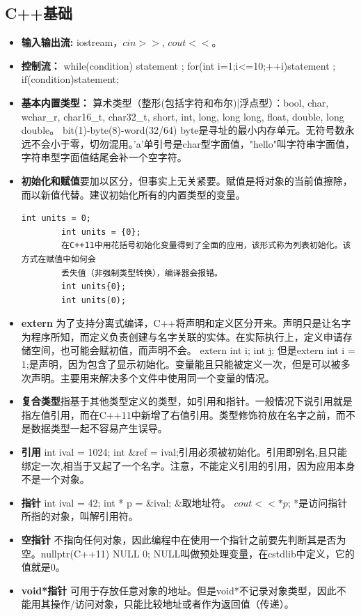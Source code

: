 \subsection{C++基础}
\begin{itemize}
	\item \textbf{输入输出流:} iostream，$cin >>$, $cout <<$。
	\item \textbf{控制流：} while(condition) {statement} ; for(int i=1;i<=10;++i){statement} ; if(condition){statement};
	\item \textbf{基本内置类型：} 算术类型（整形(包括字符和布尔)|浮点型）：bool, char, wchar\_r, char16\_t, char32\_t, short, int, long, long long, float, double, long double。 bit(1)-byte(8)-word(32/64) byte是寻址的最小内存单元。无符号数永远不会小于零，切勿混用。'a'单引号是char型字面值，"hello"叫字符串字面值，字符串型字面值结尾会补一个空字符。
	\item \textbf{初始化和赋值}要加以区分，但事实上无关紧要。赋值是将对象的当前值擦除，而以新值代替。建议初始化所有的内置类型的变量。
	\begin{lstlisting}[caption={}]
		int units = 0;
		int units = {0};
		在C++11中用花括号初始化变量得到了全面的应用，该形式称为列表初始化。该方式在赋值中如何会
		丢失值（非强制类型转换），编译器会报错。
		int units{0}; 
		int units(0);
	\end{lstlisting}
	\item \textbf{extern} 为了支持分离式编译，C++将声明和定义区分开来。声明只是让名字为程序所知，而定义负责创建与名字关联的实体。在实际执行上，定义申请存储空间，也可能会赋初值，而声明不会。 extern int i; int j; 但是extern int i = 1;是声明，因为包含了显示初始化。变量能且只能被定义一次，但是可以被多次声明。主要用来解决多个文件中使用同一个变量的情况。
	\item \textbf{复合类型}指基于其他类型定义的类型，如引用和指针。一般情况下说引用就是指左值引用，而在C++11中新增了右值引用。类型修饰符放在名字之前，而不是数据类型一起不容易产生误导。
	\item \textbf{引用} int ival = 1024; int $\&$ref = ival;引用必须被初始化。引用即别名,且只能绑定一次,相当于又起了一个名字。注意，不能定义引用的引用，因为应用本身不是一个对象。
	\item \textbf{指针} int ival = 42; int * p = \&ival; \&取地址符。 $cout << *p$; *是访问指针所指的对象，叫解引用符。
	\item \textbf{空指针} 不指向任何对象，因此编程中在使用一个指针之前要先判断其是否为空。nullptr(C++11) NULL 0; NULL叫做预处理变量，在cstdlib中定义，它的值就是0。
	\item \textbf{void*指针} 可用于存放任意对象的地址。但是void*不记录对象类型，因此不能用其操作/访问对象，只能比较地址或者作为返回值（传递）。

\end{itemize}
